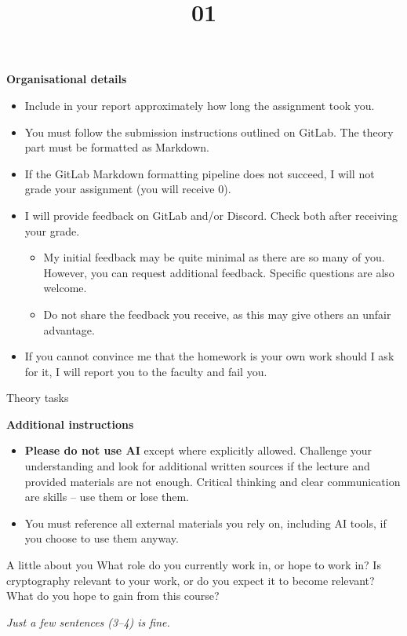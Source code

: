 \documentclass{homework}
\title{01}
\begin{document}
\maketitle

\textbf{Organisational details}

\begin{itemize}
  \item Include in your report approximately how long the assignment took you.
  \item You must follow the submission instructions outlined on GitLab.
  The theory part must be formatted as Markdown.
  \item If the GitLab Markdown formatting pipeline does not succeed, I will not grade your assignment (you will receive 0).
  \item I will provide feedback on GitLab and/or Discord.
  Check both after receiving your grade.
  \begin{itemize}
    \item My initial feedback may be quite minimal as there are so many of you.
    However, you can request additional feedback.
    Specific questions are also welcome.
    \item Do not share the feedback you receive, as this may give others an unfair advantage.
  \end{itemize}
  \item If you cannot convince me that the homework is your own work should I ask for it, I will report you to the faculty and fail you.
\end{itemize}

\newpage

\begin{center}
  Theory tasks
\end{center}

\textbf{Additional instructions}

\begin{itemize}
  \item \textbf{Please do not use AI} except where explicitly allowed.
  Challenge your understanding and look for additional written sources if the lecture and provided materials are not enough.
  Critical thinking and clear communication are skills -- use them or lose them.
  \item You must reference all external materials you rely on, including AI tools, if you choose to use them anyway.
\end{itemize}

\begin{task}{A little about you}
  What role do you currently work in, or hope to work in?
  Is cryptography relevant to your work, or do you expect it to become relevant?
  What do you hope to gain from this course?

  \textit{Just a few sentences (3--4) is fine.}
\end{task}
\end{document}
